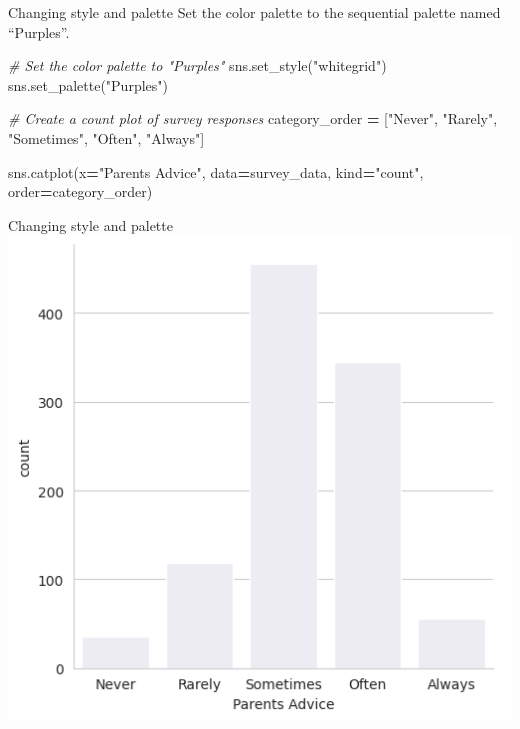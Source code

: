 \documentclass[
  ignorenonframetext,
]{beamer}
\newenvironment{Shaded}{\begin{snugshade}}{\end{snugshade}}
\newcommand{\CommentTok}[1]{\textcolor[rgb]{0.56,0.35,0.01}{\textit{#1}}}
\newcommand{\NormalTok}[1]{#1}
\newcommand{\OperatorTok}[1]{\textcolor[rgb]{0.81,0.36,0.00}{\textbf{#1}}}
\newcommand{\StringTok}[1]{\textcolor[rgb]{0.31,0.60,0.02}{#1}}
\begin{document}
\begin{frame}[fragile]{Changing style and palette}
\label{changing-style-and-palette-6}
Set the color palette to the sequential palette named ``Purples''.


\begin{Shaded}
\begin{Highlighting}[]
\CommentTok{\# Set the color palette to "Purples"}
\NormalTok{sns.set\_style(}\StringTok{"whitegrid"}\NormalTok{)}
\NormalTok{sns.set\_palette(}\StringTok{"Purples"}\NormalTok{)}

\CommentTok{\# Create a count plot of survey responses}
\NormalTok{category\_order }\OperatorTok{=}\NormalTok{ [}\StringTok{"Never"}\NormalTok{, }\StringTok{"Rarely"}\NormalTok{, }\StringTok{"Sometimes"}\NormalTok{, }
                  \StringTok{"Often"}\NormalTok{, }\StringTok{"Always"}\NormalTok{]}

\NormalTok{sns.catplot(x}\OperatorTok{=}\StringTok{"Parents Advice"}\NormalTok{, }
\NormalTok{            data}\OperatorTok{=}\NormalTok{survey\_data, }
\NormalTok{            kind}\OperatorTok{=}\StringTok{"count"}\NormalTok{, }
\NormalTok{            order}\OperatorTok{=}\NormalTok{category\_order)}
\end{Highlighting}
\end{Shaded}
\end{frame}

\begin{frame}{Changing style and palette}
\label{changing-style-and-palette-7}
\includegraphics{../images/im297.png}
\end{frame}
\end{document}
